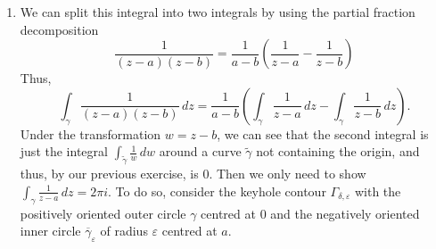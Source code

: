 \documentclass[12 pt, letterpaper]{hmcpset}
\begin{document}
\begin{solution}
\begin{enumerate}
			For $n = -1$, we claim that $\log z$ is a primitive of $1 / z$ in any region not containing the origin. From our calculations in HW \#1, we get
			\[
				\begin{split}
					\frac{d (\log z)}{d z} & = 2 \frac{\partial u}{\partial z} \\
							       & = \frac{\partial u}{\partial x} + \frac{1}{i} \frac{\partial u}{\partial y} \\
							       & = \left ( \frac{\partial u}{\partial r} \frac{\partial r}{\partial x} + \frac{\partial u}{\partial \theta} \frac{\partial \theta}{\partial x} \right ) + \left ( \frac{\partial u}{\partial r} \frac{\partial r}{\partial y} + \frac{\partial u}{\partial \theta} \frac{\partial \theta}{\partial y} \right ) \\
							       & = \left ( \frac{1}{r} \cos{\theta} + 0 \right ) + \frac{1}{i} \left ( \frac{1}{r} \sin{\theta} + 0 \right ) \\
							       & = \frac{\cos{\theta} - i \sin{\theta}}{r} \\
							       & = \frac{1}{z}.
				\end{split}
			\]
			Since a circle that doesn't contain the origin is contained in the region $r > 0$, $- \pi < \theta < \pi$, $\log z$ is the primitive of $1/z$ everywhere in an open region containing the circle. Thus, by the fundamental theorem of calculus, the integral over the closed curve $\gamma$ is $0$.
		\item We can split this integral into two integrals by using the partial fraction decomposition
			\[
				\frac{1}{(z - a)(z - b)} = \frac{1}{a - b} \left ( \frac{1}{z - a} - \frac{1}{z - b} \right )
			\]
			Thus,
			\[
				\int_{\gamma} \frac{1}{(z - a)(z - b)} \, dz = \frac{1}{a - b} \left ( \int_{\gamma} \frac{1}{z - a} \, dz - \int_{\gamma} \frac{1}{z - b} \, dz \right ).
			\]
			Under the transformation $w = z - b$, we can see that the second integral is just the integral $\int_{\tilde{\gamma}} \frac{1}{w} \, dw $ around a curve $\tilde{\gamma}$ not containing the origin, and thus, by our previous exercise, is $0$. Then we only need to show $\int_{\gamma} \frac{1}{z - a} \, dz = 2 \pi i$. To do so, consider the keyhole contour $\Gamma_{\delta, \varepsilon}$ with the positively oriented outer circle $\gamma$ centred at $0$ and the negatively oriented inner circle $\overline{\gamma}_{\varepsilon}$ of radius $\varepsilon$ centred at $a$. 
			

\end{enumerate}
\end{solution}
\end{document}
